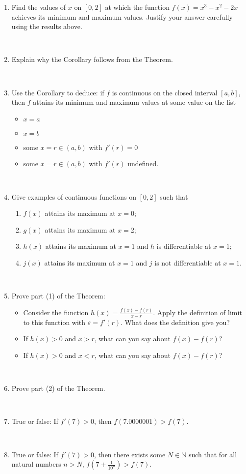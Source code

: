\documentclass[12pt]{amsart}
\newcommand{\N}{\mathbb{N}}
\newcommand{\e}{\varepsilon}
\newcommand{\ds}{\displaystyle}
\begin{document}
 \begin{enumerate}
 
 \item Find the values of $x$ on $[0,2]$ at which the function $f(x) = x^3-x^2-2x$ achieves its minimum and maximum values. Justify your answer carefully using the results above.
 
 \ 
 
 \item Explain why the Corollary follows from the Theorem.
 
 \
 
 \item Use the Corollary to deduce: if $f$ is continuous on the closed interval $[a,b]$, then $f$ attains its minimum and maximum values at some value on the list
\begin{itemize}
\item $x=a$
\item $x=b$
\item some $x=r\in (a,b)$ with $f'(r)=0$
\item some $x=r\in (a,b)$ with $f'(r)$ undefined.
\end{itemize}

\
 
 \item Give examples of continuous functions on $[0,2]$ such that
 \begin{enumerate}
 \item $f(x)$ attains its maximum at $x=0$;
 \item $g(x)$ attains its maximum at $x=2$;
 \item $h(x)$ attains its maximum at $x=1$ and $h$ is differentiable at $x=1$;
 \item $j(x)$ attains its maximum at $x=1$ and $j$ is not differentiable at $x=1$.
 \end{enumerate}
 
 \
 
 \item Prove part (1) of the Theorem:
 \begin{itemize}
 \item Consider the function $\ds h(x) = \frac{ f(x) - f(r) }{x-r}$. Apply the definition of limit to this function with $\e = f'(r)$. What does the definition give you?
 \item If $h(x) > 0$ and $x>r$, what can you say about $f(x) - f(r)$?
  \item If $h(x) > 0$ and $x<r$, what can you say about $f(x) - f(r)$?
  \end{itemize}


\

 \item Prove part (2) of the Theorem.
 
 \
 
 \item True or false: If $f'(7)>0$, then $f(7.0000001)>f(7)$.
 
 \
 
  \item True or false: If $f'(7)>0$, then there exists some $N\in \N$ such that for all natural numbers $n>N$,  $f\left(7+ \frac{1}{10^n}\right)>f(7)$.

 
\end{enumerate}
\end{document}
